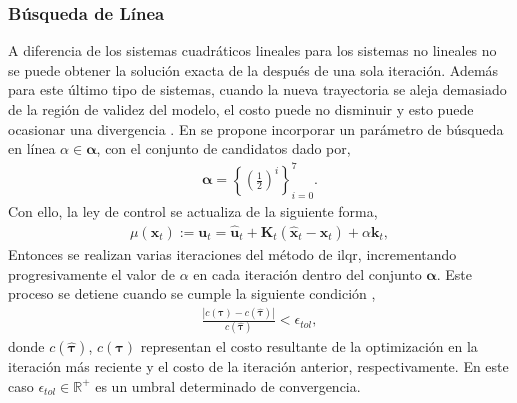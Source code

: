 \subsubsection{Búsqueda de Línea}
A diferencia de los sistemas cuadráticos lineales para los sistemas no lineales no se puede obtener la solución exacta de la  después de una sola iteración. Además para este último tipo de sistemas, cuando la nueva trayectoria se aleja demasiado de la región de validez del modelo, el costo puede no disminuir y esto puede ocasionar una divergencia \cite{Tassa2012}. En \cite{Tassa2012} se propone incorporar un parámetro de búsqueda en línea $\alpha \in \bm{\alpha}$, con el conjunto de candidatos dado por, 
\begin{align}
\bm{\alpha} = \left\{\left(\frac{1}{2}\right)^i\right\}_{i=0}^{7}.
\end{align}
Con ello, la ley de control se actualiza de la siguiente forma,
\begin{align} \label{eq:control_law_alpha}
    \mu(\mathbf{x}_t) := \mathbf{u}_t = \hat{\mathbf{u}}_t + \mathbf{K}_t(\hat{\mathbf{x}}_t-\mathbf{x}_t) + \alpha\mathbf{k}_t,
\end{align}
Entonces se realizan varias iteraciones del método de \acrshort{ilqr}, incrementando progresivamente el valor de $\alpha$ en cada iteración dentro del conjunto $\bm{\alpha}$. Este proceso se detiene cuando se cumple la siguiente condición \cite{ilqr2019}, 
\begin{align}
\label{eq:cost_thershold}
    \frac{|c(\bm\tau)-c\left(\hat{\bm\tau}\right)|}{c\left(\hat{\bm\tau}\right)} < \epsilon_{tol},
\end{align}
donde $c(\hat{\bm\tau})$, $c(\bm\tau)$ representan el costo resultante de la optimización en la iteración más reciente y el costo de la iteración anterior, respectivamente. En este caso $\epsilon_{tol}\in\mathbb{R}^{+}$ es un umbral determinado de convergencia.


